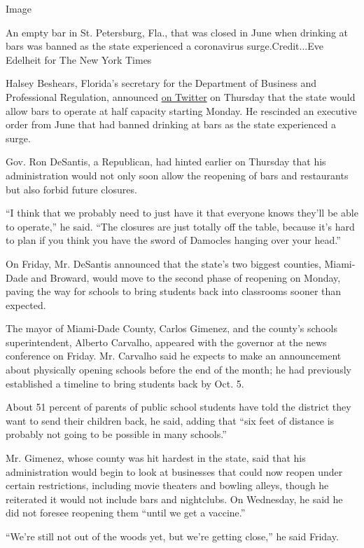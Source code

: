 Image

An empty bar in St. Petersburg, Fla., that was closed in June when
drinking at bars was banned as the state experienced a coronavirus
surge.Credit...Eve Edelheit for The New York Times

Halsey Beshears, Florida's secretary for the Department of Business and
Professional Regulation, announced
\href{https://twitter.com/HalseyBeshears/status/1304194720856408064?s=20}{on
Twitter} on Thursday that the state would allow bars to operate at half
capacity starting Monday. He rescinded an executive order from June that
had banned drinking at bars as the state experienced a surge.

Gov. Ron DeSantis, a Republican, had hinted earlier on Thursday that his
administration would not only soon allow the reopening of bars and
restaurants but also forbid future closures.

``I think that we probably need to just have it that everyone knows
they'll be able to operate,'' he said. ``The closures are just totally
off the table, because it's hard to plan if you think you have the sword
of Damocles hanging over your head.''

On Friday, Mr. DeSantis announced that the state's two biggest counties,
Miami-Dade and Broward, would move to the second phase of reopening on
Monday, paving the way for schools to bring students back into
classrooms sooner than expected.

The mayor of Miami-Dade County, Carlos Gimenez, and the county's schools
superintendent, Alberto Carvalho, appeared with the governor at the news
conference on Friday. Mr. Carvalho said he expects to make an
announcement about physically opening schools before the end of the
month; he had previously established a timeline to bring students back
by Oct. 5.

About 51 percent of parents of public school students have told the
district they want to send their children back, he said, adding that
``six feet of distance is probably not going to be possible in many
schools.''

Mr. Gimenez, whose county was hit hardest in the state, said that his
administration would begin to look at businesses that could now reopen
under certain restrictions, including movie theaters and bowling alleys,
though he reiterated it would not include bars and nightclubs. On
Wednesday, he said he did not foresee reopening them ``until we get a
vaccine.''

``We're still not out of the woods yet, but we're getting close,'' he
said Friday.

